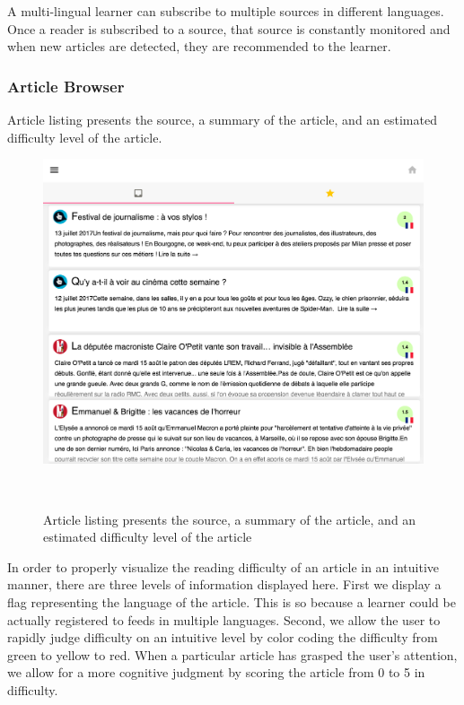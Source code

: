 A multi-lingual learner can subscribe to multiple sources in different languages. Once a reader is subscribed to a source, that source is constantly monitored and when new articles are detected, they are recommended to the learner.

\subsubsection{Article Browser}

Article listing presents the source, a summary of the article, and an estimated difficulty level of the article.

    \begin{figure}[h!]
    \centering
      \includegraphics[width=0.95\columnwidth]{figures/article_listing}
      \caption{Article listing presents the source, a summary of the article, and an estimated difficulty level of the article }~
      \label{fig:registrations}
    \end{figure}


In order to properly visualize the reading difficulty of an article in an intuitive manner, there are three levels of information displayed here. First we display a flag representing the language of the article. This is so because a learner could be actually registered to feeds in multiple languages. Second, we allow the user to rapidly judge difficulty on an intuitive level by color coding the difficulty from green to yellow to red. When a particular article has grasped the user's attention, we allow for a more cognitive judgment by scoring the article from 0 to 5 in difficulty.

